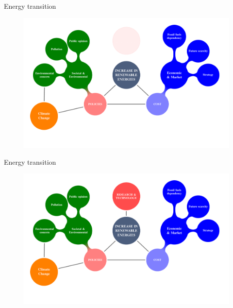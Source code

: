 \documentclass{beamer}%
\begin{document}
\begin{frame}[fragile]{Energy transition}
\begin{figure}
\centering\includegraphics[scale=0.4]{diagrama5.pdf}
\end{figure} 
\end{frame}

\begin{frame}[fragile]{Energy transition}
\begin{figure}
\centering\includegraphics[scale=0.4]{diagram.pdf}
\end{figure} 
\end{frame}
\end{document}
